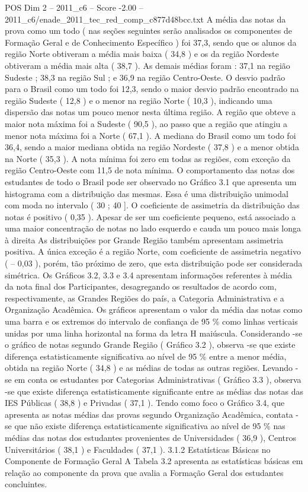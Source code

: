 \begin{textsample}{POS Dim 2 – 2011\_c6 – Score -2.00 – 2011\_c6/enade\_2011\_tec\_red\_comp\_c877d48bcc.txt}
A média das notas da prova como um todo ( nas seções seguintes serão analisados os componentes de Formação Geral e de Conhecimento Específico ) foi 37,3, sendo que os alunos da região Norte obtiveram a média mais baixa ( 34,8 ) e os da região Nordeste obtiveram a média mais alta ( 38,7 ).
As demais médias foram : 37,1 na região Sudeste ; 38,3 na região Sul ; e 36,9 na região Centro-Oeste.
O desvio padrão para o Brasil como um todo foi 12,3, sendo o maior desvio padrão encontrado na região Sudeste ( 12,8 ) e o menor na região Norte ( 10,3 ), indicando uma dispersão das notas um pouco menor nesta última região.
A região que obteve a maior nota máxima foi a Sudeste ( 90,5 ), ao passo que a região que atingiu a menor nota máxima foi a Norte ( 67,1 ).
A mediana do Brasil como um todo foi 36,4, sendo a maior mediana obtida na região Nordeste ( 37,8 ) e a menor obtida na Norte ( 35,3 ).
A nota mínima foi zero em todas as regiões, com exceção da região Centro-Oeste com 11,5 de nota mínima.
O comportamento das notas dos estudantes de todo o Brasil pode ser observado no Gráfico 3.1 que apresenta um histograma com a distribuição das mesmas.
Essa é uma distribuição unimodal com moda no intervalo ( 30 ; 40 ].
O coeficiente de assimetria da distribuição das notas é positivo ( 0,35 ).
Apesar de ser um coeficiente pequeno, está associado a uma maior concentração de notas no lado esquerdo e cauda um pouco mais longa à direita As distribuições por Grande Região também apresentam assimetria positiva.
A única exceção é a região Norte, com coeficiente de assimetria negativo ( – 0,03 ), porém, tão próximo de zero, que esta distribuição pode ser considerada simétrica.
Os Gráficos 3.2, 3.3 e 3.4 apresentam informações referentes à média da nota final dos Participantes, desagregando os resultados de acordo com, respectivamente, as Grandes Regiões do país, a Categoria Administrativa e a Organização Acadêmica.
Os gráficos apresentam o valor da média das notas como uma barra e os extremos do intervalo de confiança de 95 \% como linhas verticais unidas por uma linha horizontal na forma da letra H maiúscula.
Considerando -se o gráfico de notas segundo Grande Região ( Gráfico 3.2 ), observa -se que existe diferença estatisticamente significativa ao nível de 95 \% entre a menor média, obtida na região Norte ( 34,8 ) e as médias de todas as outras regiões.
Levando -se em conta os estudantes por Categorias Administrativas ( Gráfico 3.3 ), observa -se que existe diferença estatisticamente significante entre as médias das notas das IES Públicas ( 38,8 ) e Privadas ( 37,1 ).
Tendo como foco o Gráfico 3.4, que apresenta as notas médias das provas segundo Organização Acadêmica, contata -se que não existe diferença estatisticamente significativa ao nível de 95 \% nas médias das notas dos estudantes provenientes de Universidades ( 36,9 ), Centros Universitários ( 38,1 ) e Faculdades ( 37,1 ). 3.1.2 Estatísticas Básicas no Componente de Formação Geral A Tabela 3.2 apresenta as estatísticas básicas em relação ao componente da prova que avalia a Formação Geral dos estudantes concluintes.

\end{textsample}
